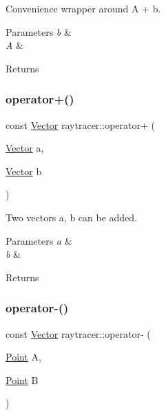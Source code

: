 Convenience wrapper around A + b. 


\begin{DoxyParams}{Parameters}
{\em b} & \\
\hline
{\em A} & \\
\hline
\end{DoxyParams}
\begin{DoxyReturn}{Returns}

\end{DoxyReturn}
\mbox{\label{group__api_gaa2334c02fb14a238c09edd45c99e33fa}} 
\subsubsection{\texorpdfstring{operator+()}{operator+()}\hspace{0.1cm}{\footnotesize\ttfamily [3/3]}}
{\footnotesize\ttfamily const \hyperlink{classraytracer_1_1Vector}{Vector} raytracer\+::operator+ (\begin{DoxyParamCaption}\item[{\hyperlink{classraytracer_1_1Vector}{Vector}}]{a,  }\item[{\hyperlink{classraytracer_1_1Vector}{Vector}}]{b }\end{DoxyParamCaption})}



Two vectors a, b can be added. 


\begin{DoxyParams}{Parameters}
{\em a} & \\
\hline
{\em b} & \\
\hline
\end{DoxyParams}
\begin{DoxyReturn}{Returns}

\end{DoxyReturn}
\mbox{\label{group__api_ga600238d4569fec2dd95c6fec3f4e8b30}} 
\subsubsection{\texorpdfstring{operator-\/()}{operator-()}\hspace{0.1cm}{\footnotesize\ttfamily [1/2]}}
{\footnotesize\ttfamily const \hyperlink{classraytracer_1_1Vector}{Vector} raytracer\+::operator-\/ (\begin{DoxyParamCaption}\item[{\hyperlink{classraytracer_1_1Point}{Point}}]{A,  }\item[{\hyperlink{classraytracer_1_1Point}{Point}}]{B }\end{DoxyParamCaption})}



